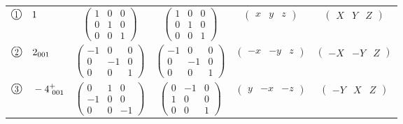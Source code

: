 \documentclass[fleqn,10pt,landscape]{jsarticle}
\begin{document}
\begin{center}
\begin{longtable}{lcccc}
$ {\ooalign{\hfil\resizebox{.8\width}{\height}{1}\hfil\crcr\raise.1ex\hbox{\large$\bigcirc$}}}\quad 1 $ & $ \begin{pmatrix} 1 & 0 & 0 \\ 0 & 1 & 0 \\ 0 & 0 & 1 \end{pmatrix} $ & $ \begin{pmatrix} 1 & 0 & 0 \\ 0 & 1 & 0 \\ 0 & 0 & 1 \end{pmatrix} $ & $ \begin{pmatrix} x & y & z \end{pmatrix} $ & $ \begin{pmatrix} X & Y & Z \end{pmatrix} $ \\
$ {\ooalign{\hfil\resizebox{.8\width}{\height}{2}\hfil\crcr\raise.1ex\hbox{\large$\bigcirc$}}}\quad 2{}_{001} $ & $ \begin{pmatrix} -1 & 0 & 0 \\ 0 & -1 & 0 \\ 0 & 0 & 1 \end{pmatrix} $ & $ \begin{pmatrix} -1 & 0 & 0 \\ 0 & -1 & 0 \\ 0 & 0 & 1 \end{pmatrix} $ & $ \begin{pmatrix} - x & - y & z \end{pmatrix} $ & $ \begin{pmatrix} - X & - Y & Z \end{pmatrix} $ \\
$ {\ooalign{\hfil\resizebox{.8\width}{\height}{3}\hfil\crcr\raise.1ex\hbox{\large$\bigcirc$}}}\quad -4^{+}_{\,\,001} $ & $ \begin{pmatrix} 0 & 1 & 0 \\ -1 & 0 & 0 \\ 0 & 0 & -1 \end{pmatrix} $ & $ \begin{pmatrix} 0 & -1 & 0 \\ 1 & 0 & 0 \\ 0 & 0 & 1 \end{pmatrix} $ & $ \begin{pmatrix} y & - x & - z \end{pmatrix} $ & $ \begin{pmatrix} - Y & X & Z \end{pmatrix} $ \\

\end{longtable}
\end{center}
\end{document}
